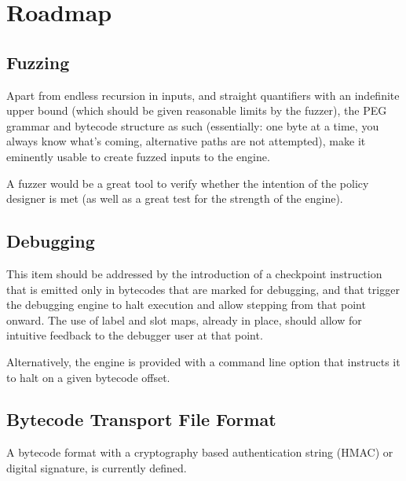 \section{Roadmap}

\subsection{Fuzzing}

Apart from endless recursion in inputs, and straight quantifiers with
an indefinite upper bound (which should be given reasonable limits by
the fuzzer), the PEG grammar and bytecode structure as such (essentially:
one byte at a time, you always know what's coming, alternative paths are
not attempted), make it eminently usable to create fuzzed inputs to the engine.

A fuzzer would be a great tool to verify whether the intention of the
policy designer is met
(as well as a great test for the strength of the engine).

\subsection{Debugging}

This item should be addressed by the introduction of a checkpoint instruction
that is emitted only in bytecodes that are marked for debugging, and that
trigger the debugging engine to halt execution and allow stepping from that
point onward. The use of label and slot maps, already in place, should allow
for intuitive feedback to the debugger user at that point.

Alternatively, the engine is provided with a command line option that
instructs it to halt on a given bytecode offset.

\subsection{Bytecode Transport File Format}

A bytecode format with a cryptography based authentication string (HMAC)
or digital signature, is currently defined.
